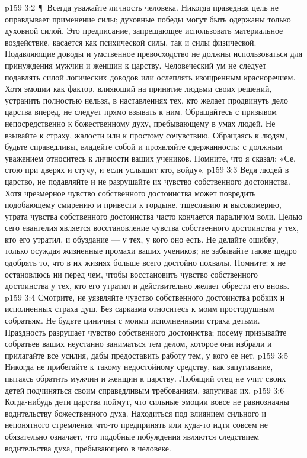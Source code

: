 \vs p159 3:2 \P\ Всегда уважайте личность человека. Никогда праведная цель не оправдывает применение силы; духовные победы могут быть одержаны только духовной силой. Это предписание, запрещающее использовать материальное воздействие, касается как психической силы, так и силы физической. Подавляющие доводы и умственное превосходство не должны использоваться для принуждения мужчин и женщин к царству. Человеческий ум не следует подавлять силой логических доводов или ослеплять изощренным красноречием. Хотя эмоции как фактор, влияющий на принятие людьми своих решений, устранить полностью нельзя, в наставлениях тех, кто желает продвинуть дело царства вперед, не следует прямо взывать к ним. Обращайтесь с призывом непосредственно к божественному духу, пребывающему в умах людей. Не взывайте к страху, жалости или к простому сочувствию. Обращаясь к людям, будьте справедливы, владейте собой и проявляйте сдержанность; с должным уважением относитесь к личности ваших учеников. Помните, что я сказал: «Се, стою при дверях и стучу, и если услышит кто, войду».
\vs p159 3:3 Ведя людей в царство, не подавляйте и не разрушайте их чувство собственного достоинства. Хотя чрезмерное чувство собственного достоинства может повредить подобающему смирению и привести к гордыне, тщеславию и высокомерию, утрата чувства собственного достоинства часто кончается параличом воли. Целью сего евангелия является восстановление чувства собственного достоинства у тех, кто его утратил, и обуздание --- у тех, у кого оно есть. Не делайте ошибку, только осуждая жизненные промахи ваших учеников; не забывайте также щедро одобрять то, что в их жизнях больше всего достойно похвалы. Помните: я не остановлюсь ни перед чем, чтобы восстановить чувство собственного достоинства у тех, кто его утратил и действительно желает обрести его вновь.
\vs p159 3:4 Смотрите, не уязвляйте чувство собственного достоинства робких и исполненных страха душ. Без сарказма относитесь к моим простодушным собратьям. Не будьте циничны с моими исполненными страха детьми. Праздность разрушает чувство собственного достоинства; посему призывайте собратьев ваших неустанно заниматься тем делом, которое они избрали и прилагайте все усилия, дабы предоставить работу тем, у кого ее нет.
\vs p159 3:5 Никогда не прибегайте к такому недостойному средству, как запугивание, пытаясь обратить мужчин и женщин к царству. Любящий отец не учит своих детей подчиняться своим справедливым требованиям, запугивая их.
\vs p159 3:6 Когда\hyp{}нибудь дети царства поймут, что сильные эмоции вовсе не равнозначны водительству божественного духа. Находиться под влиянием сильного и непонятного стремления что\hyp{}то предпринять или куда\hyp{}то идти совсем не обязательно означает, что подобные побуждения являются следствием водительства духа, пребывающего в человеке.
